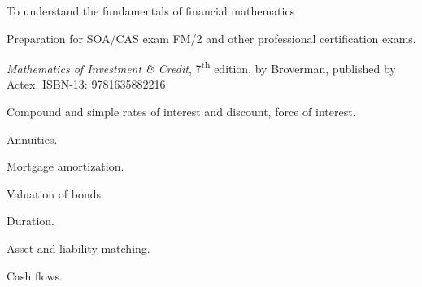 \documentclass{osucourse}
\begin{document}
\CatalogDescription
\PrerequisitesAndExclusions

\begin{Purpose}
To understand the fundamentals of financial mathematics

Preparation for SOA/CAS exam FM/2 and other professional certification exams.
\end{Purpose}

\begin{Text}
\emph{Mathematics of Investment \& Credit}, 7\textsuperscript{th} edition, by Broverman, published by Actex. ISBN-13: 9781635882216
\end{Text}

\begin{TopicsList}
\item Compound and simple rates of interest and discount, force of interest.
\item Annuities.
\item Mortgage amortization.
\item Valuation of bonds.
\item Duration.
\item Asset and liability matching.
\item Cash flows.
\end{TopicsList}
\end{document}
